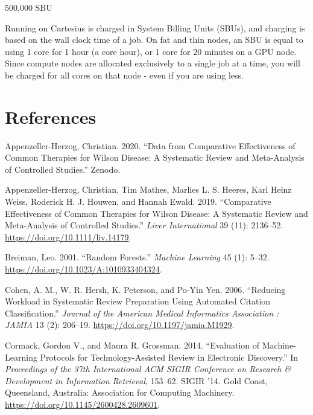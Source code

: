 \documentclass[
]{article}
\newlength{\cslhangindent}
\newenvironment{cslreferences}%
  {\setlength{\parindent}{0pt}%
  \everypar{\setlength{\hangindent}{\cslhangindent}}\ignorespaces}%
  {\par}
\begin{document}
500,000 SBU

Running on Cartesius is charged in System Billing Units (SBUs), and
charging is based on the wall clock time of a job. On fat and thin
nodes, an SBU is equal to using 1 core for 1 hour (a core hour), or 1
core for 20 minutes on a GPU node. Since compute nodes are allocated
exclusively to a single job at a time, you will be charged for all cores
on that node - even if you are using less.

\hypertarget{references}{%
\section*{References}\label{references}}

\hypertarget{refs}{}
\begin{cslreferences}
\leavevmode\hypertarget{ref-Appenzeller-Herzog2020}{}%
Appenzeller-Herzog, Christian. 2020. ``Data from Comparative
Effectiveness of Common Therapies for Wilson Disease: A Systematic
Review and Meta-Analysis of Controlled Studies.'' Zenodo.

\leavevmode\hypertarget{ref-Appenzeller-Herzog2019}{}%
Appenzeller-Herzog, Christian, Tim Mathes, Marlies L. S. Heeres, Karl
Heinz Weiss, Roderick H. J. Houwen, and Hannah Ewald. 2019.
``Comparative Effectiveness of Common Therapies for Wilson Disease: A
Systematic Review and Meta-Analysis of Controlled Studies.'' \emph{Liver
International} 39 (11): 2136--52.
\url{https://doi.org/10.1111/liv.14179}.

\leavevmode\hypertarget{ref-Breiman2001}{}%
Breiman, Leo. 2001. ``Random Forests.'' \emph{Machine Learning} 45 (1):
5--32. \url{https://doi.org/10.1023/A:1010933404324}.

\leavevmode\hypertarget{ref-Cohen2006}{}%
Cohen, A. M., W. R. Hersh, K. Peterson, and Po-Yin Yen. 2006. ``Reducing
Workload in Systematic Review Preparation Using Automated Citation
Classification.'' \emph{Journal of the American Medical Informatics
Association : JAMIA} 13 (2): 206--19.
\url{https://doi.org/10.1197/jamia.M1929}.

\leavevmode\hypertarget{ref-Cormack2014}{}%
Cormack, Gordon V., and Maura R. Grossman. 2014. ``Evaluation of
Machine-Learning Protocols for Technology-Assisted Review in Electronic
Discovery.'' In \emph{Proceedings of the 37th International ACM SIGIR
Conference on Research \& Development in Information Retrieval},
153--62. SIGIR '14. Gold Coast, Queensland, Australia: Association for
Computing Machinery. \url{https://doi.org/10.1145/2600428.2609601}.


\end{cslreferences}
\end{document}
